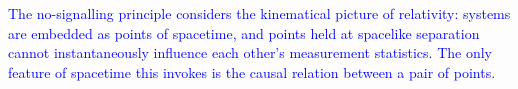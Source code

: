 \documentclass[prl,aps,reprint,twocolumn,10pt,superscriptaddress,floatfix]{revtex4-2}
\begin{document}
\textcolor{blue}{The no-signalling principle considers the kinematical
picture of relativity: systems are embedded as points of spacetime, and
points held at spacelike separation cannot instantaneously influence each
other's measurement statistics. The only feature of spacetime this invokes
is the causal relation between a pair of points.}


%
\end{document}

